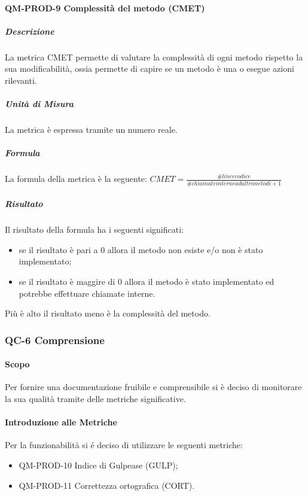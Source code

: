 		\paragraph{QM-PROD-9 Complessità del metodo (CMET)}
			\subparagraph{Descrizione}
				La metrica CMET permette di valutare la complessità di ogni metodo rispetto la sua modificabilità, ossia permette di capire se un metodo è una  o esegue azioni rilevanti.
			\subparagraph{Unità di Misura}
				La metrica è espressa tramite un numero reale.
			\subparagraph{Formula}
				La formula della metrica è la seguente:
				\(
					CMET = \frac{\# linee codice}{\# chiamate interne ad altri metodi+1}
				\)
			\subparagraph{Risultato}
				Il risultato della formula ha i seguenti significati:
				\begin{itemize}
					\item se il risultato è pari a 0 allora il metodo non esiste e/o non è stato implementato;
					\item se il risultato è maggire di 0 allora il metodo è stato implementato ed potrebbe effettuare chiamate interne.
				\end{itemize}
				Più è alto il risultato meno è la complessità del metodo.

	\subsubsection{QC-6 Comprensione}
		\paragraph{Scopo}
			Per fornire una documentazione fruibile e comprensibile si è deciso di monitorare la sua qualità tramite delle metriche significative.
		\paragraph{Introduzione alle Metriche}
			Per la funzionabilità si é deciso di utilizzare le seguenti metriche:
			\begin{itemize}
				\item QM-PROD-10 Indice di Gulpease (GULP);
				\item QM-PROD-11 Correttezza ortografica (CORT).
			\end{itemize}
